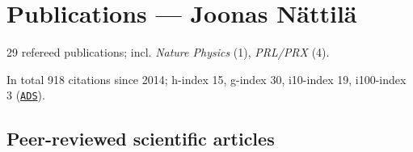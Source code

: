 \documentclass[10pt]{article}
\newcommand\VRule{\color{lightgray}\vrule width 0.5pt}
\begin{document}
%




\newpage

\section*{Publications --- Joonas N\"attil\"a}
29 refereed publications; 
incl. 
\textit{Nature Physics} (1), 
\textit{PRL/PRX} (4).

\noindent
In total 918 citations since 2014; h-index 15, g-index 30, i10-index 19, i100-index 3 (\href{http://adsabs.harvard.edu/cgi-bin/abs_connect?author=nattila,+J.&aut_syn=YES&return_req=no_params}{\nolinkurl{ADS}}).

\subsection*{\phantom{sub} Peer-reviewed scientific articles}
\end{document}
